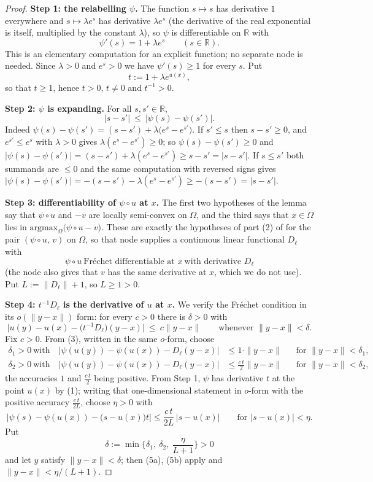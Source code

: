 \begin{proof}
\noindent\textbf{Step 1: the relabelling $\psi$.} The function $s\mapsto s$ has derivative
$1$ everywhere and $s\mapsto\lambda e^{s}$ has derivative $\lambda e^{s}$ (the derivative of
the real exponential is itself, multiplied by the constant $\lambda$), so $\psi$ is
differentiable on $\mathbb R$ with
\[
 \psi'(s)=1+\lambda e^{s}\qquad(s\in\mathbb R). \tag{1}
\]
This is an elementary computation for an explicit function; no separate node is needed.
Since $\lambda>0$ and $e^{s}>0$ we have $\psi'(s)\ge1$ for every $s$. Put
\[
 t:=1+\lambda e^{u(x)} ,
\]
so that $t\ge1$, hence $t>0$, $t\ne0$ and $t^{-1}>0$.

\medskip\noindent\textbf{Step 2: $\psi$ is expanding.} For all $s,s'\in\mathbb R$,
\[
 |s-s'|\ \le\ |\psi(s)-\psi(s')| . \tag{2}
\]
Indeed $\psi(s)-\psi(s')=(s-s')+\lambda\big(e^{s}-e^{s'}\big)$. If $s'\le s$ then
$s-s'\ge0$, and $e^{s'}\le e^{s}$ with $\lambda>0$ gives
$\lambda(e^{s}-e^{s'})\ge0$; so $\psi(s)-\psi(s')\ge0$ and
$|\psi(s)-\psi(s')|=(s-s')+\lambda(e^{s}-e^{s'})\ge s-s'=|s-s'|$. If $s\le s'$ both
summands are $\le0$ and the same computation with reversed signs gives
$|\psi(s)-\psi(s')|=-(s-s')-\lambda(e^{s}-e^{s'})\ge-(s-s')=|s-s'|$.

\medskip\noindent\textbf{Step 3: differentiability of $\psi\circ u$ at $x$.} The first two
hypotheses of the lemma say that $\psi\circ u$ and $-v$ are locally semi-convex on $\Omega$,
and the third says that $x\in\Omega$ lies in
$\mathrm{argmax}_\Omega\big(\psi\circ u-v\big)$. These are
exactly the hypotheses of part (2) of  for the pair
$(\psi\circ u,\,v)$ on $\Omega$, so that node supplies a continuous linear functional
$D_\ell$ with
\[
 \psi\circ u\ \text{Fr\'echet differentiable at }x\ \text{with derivative }D_\ell
 \tag{3}
\]
(the node also gives that $v$ has the same derivative at $x$, which we do not use). Put
$L:=\|D_\ell\|+1$, so $L\ge1>0$.

\medskip\noindent\textbf{Step 4: $t^{-1}D_\ell$ is the derivative of $u$ at $x$.} We verify
the Fr\'echet condition in its $o(\|y-x\|)$ form: for every $c>0$ there is $\delta>0$ with
\[
 \Big|u(y)-u(x)-\big(t^{-1}D_\ell\big)(y-x)\Big|\ \le\ c\|y-x\|
 \qquad\text{whenever }\|y-x\|<\delta. \tag{4}
\]
Fix $c>0$. From (3), written in the same $o$-form, choose
\begin{align}
 \delta_1>0\ \text{with}\quad
 \big|\psi(u(y))-\psi(u(x))-D_\ell(y-x)\big|&\le1\cdot\|y-x\|
 &&\text{for }\|y-x\|<\delta_1, \tag{5a}\\
 \delta_2>0\ \text{with}\quad
 \big|\psi(u(y))-\psi(u(x))-D_\ell(y-x)\big|&\le\tfrac{c\,t}2\|y-x\|
 &&\text{for }\|y-x\|<\delta_2, \tag{5b}
\end{align}
the accuracies $1$ and $\frac{c\,t}2$ being positive. From Step 1, $\psi$ has derivative $t$
at the point $u(x)$ by (1); writing that one-dimensional statement in $o$-form with the
positive accuracy $\frac{c\,t}{2L}$, choose $\eta>0$ with
\[
 \Big|\psi(s)-\psi(u(x))-\big(s-u(x)\big)t\Big|\le\frac{c\,t}{2L}\,\big|s-u(x)\big|
 \qquad\text{for }|s-u(x)|<\eta. \tag{6}
\]
Put
\[
 \delta:=\min\Big\{\delta_1,\ \delta_2,\ \frac{\eta}{L+1}\Big\}>0
\]
and let $y$ satisfy $\|y-x\|<\delta$; then (5a), (5b) apply and $\|y-x\|<\eta/(L+1)$.


\end{proof}
